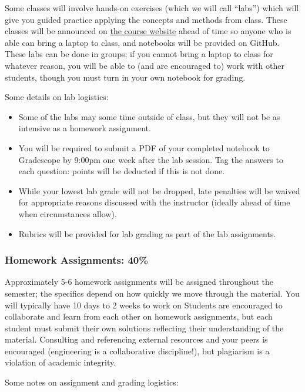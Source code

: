 \documentclass[
  letterpaper,
  DIV=11,
  numbers=noendperiod]{scrartcl}
\providecommand{\tightlist}{%
  \setlength{\itemsep}{0pt}\setlength{\parskip}{0pt}}\usepackage{longtable,booktabs,array}
\begin{document}
Some classes will involve hands-on exercises (which we will call
``labs'') which will give you guided practice applying the concepts and
methods from class. These classes will be announced on
\href{https://viveks.me/environmental-systems-analysis}{the course
website} ahead of time so anyone who is able can bring a laptop to
class, and notebooks will be provided on GitHub. These labs can be done
in groups; if you cannot bring a laptop to class for whatever reason,
you will be able to (and are encouraged to) work with other students,
though you must turn in your own notebook for grading.

Some details on lab logistics:

\begin{itemize}
\tightlist
\item
  Some of the labs may some time outside of class, but they will not be
  as intensive as a homework assignment.
\item
  You will be required to submit a PDF of your completed notebook to
  Gradescope by 9:00pm one week after the lab session. Tag the answers
  to each question: points will be deducted if this is not done.
\item
  While your lowest lab grade will not be dropped, late penalties will
  be waived for appropriate reasons discussed with the instructor
  (ideally ahead of time when circumstances allow).
\item
  Rubrics will be provided for lab grading as part of the lab
  assignments.
\end{itemize}

\hypertarget{homework-assignments-40}{%
\subsubsection{Homework Assignments:
40\%}\label{homework-assignments-40}}

Approximately 5-6 homework assignments will be assigned throughout the
semester; the specifics depend on how quickly we move through the
material. You will typically have 10 days to 2 weeks to work on Students
are encouraged to collaborate and learn from each other on homework
assignments, but each student must submit their own solutions reflecting
their understanding of the material. Consulting and referencing external
resources and your peers is encouraged (engineering is a collaborative
discipline!), but plagiarism is a violation of academic integrity.

Some notes on assignment and grading logistics:
\end{document}
